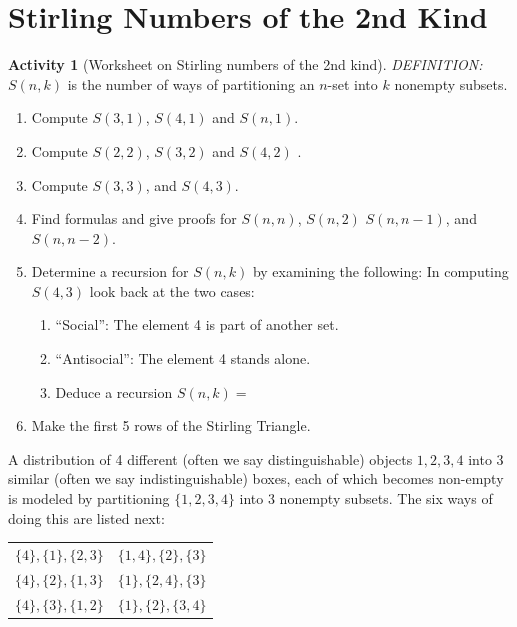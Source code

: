 \documentclass[10pt,]{book}
\theoremstyle{plain}
\theoremstyle{definition}
\theoremstyle{definition}
\theoremstyle{definition}
\newtheorem{activity}[project]{Activity}
\theoremstyle{definition}
\numberwithin{equation}{chapter}
\begin{document}
\section[{Stirling Numbers of the 2nd Kind}]{Stirling Numbers of the 2nd Kind}\label{sec_adv-stirling}
\begin{activity}[Worksheet on Stirling numbers of the 2nd kind]\label{activity-115}
\hypertarget{p-1165}{}%
\emph{DEFINITION:} \(S\left( n,k \right)\) is the number of ways of partitioning an \(n\)-set into \(k\) nonempty subsets.%
\begin{enumerate}[font=\bfseries,label=(\alph*),ref=\alph*]
\item\label{task-118} \hypertarget{p-1166}{}%
Compute \(S(3,1)\), \(S(4,1)\) and \(S(n,1)\).%
\item\label{task-119} \hypertarget{p-1167}{}%
Compute \(S(2,2)\), \(S(3,2)\) and \(S(4,2)\) .%
\item\label{task-120} \hypertarget{p-1168}{}%
Compute \(S(3,3)\), and \(S(4,3)\).%
\item\label{task-121} \hypertarget{p-1169}{}%
Find formulas and give proofs for \(S(n,n)\), \(S(n,2)\) \(S(n,n - 1)\), and \(S(n,n-2)\).%
\item\label{task-122} \hypertarget{p-1170}{}%
Determine a recursion for \(S(n,k)\) by examining the following: In computing \(S\left( 4,3 \right)\) look back at the two cases: \leavevmode%
\begin{enumerate}
\item\hypertarget{li-212}{}\hypertarget{p-1171}{}%
``Social'': The element 4 is part of another set.%
\item\hypertarget{li-213}{}\hypertarget{p-1172}{}%
``Antisocial'': The element 4 stands alone.%
\item\hypertarget{li-214}{}\hypertarget{p-1173}{}%
Deduce a recursion \(S\left( n,k \right) =\)%
\end{enumerate}
%
\item\label{task-123} \hypertarget{p-1174}{}%
Make the first 5 rows of the Stirling Triangle.%
\end{enumerate}
\end{activity}
\hypertarget{p-1175}{}%
A distribution of 4 different (often we say distinguishable) objects \(1,2,3,4\) into 3 similar (often we say indistinguishable) boxes, each of which becomes non-empty is modeled by partitioning \(\{ 1,2,3,4\}\) into 3 nonempty subsets. The six ways of doing this are listed next:%
\begin{sidebyside}{1}{0.25}{0.25}{0}
\begin{sbspanel}{0.5}
{\centering%
\begin{tabular}{ll}
\(\{4\}, \{1\}, \{2,3\}\)&\(\{1,4\}, \{2\}, \{3\}\)\tabularnewline[0pt]
\(\{4\}, \{2\}, \{1,3\}\)&\(\{1\}, \{2,4\}, \{3\}\)\tabularnewline[0pt]
\(\{4\}, \{3\}, \{1,2\}\)&\(\{1\}, \{2\}, \{3,4\}\)
\end{tabular}
\par}
\end{sbspanel}
\end{sidebyside}
\end{document}
